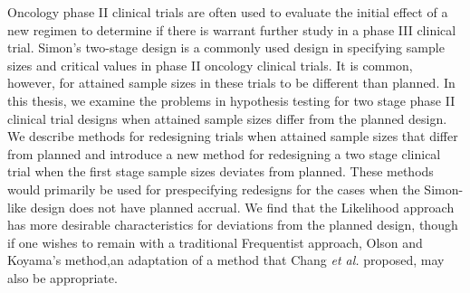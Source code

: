 \documentclass[12pt]{report}\usepackage[]{graphicx}\usepackage[]{color}
\newlength{\li}\setlength{\li}{14.48pt}
\newlength{\di}\setlength{\di}{-3.5mm}
\begin{document}
\vspace{7mm}
Oncology phase II clinical trials are often used to evaluate the initial effect of a new regimen to determine if there is warrant further study in a phase III clinical trial. Simon's two-stage design is a commonly used design in specifying sample sizes and critical values in phase II oncology clinical trials. It is common, however, for attained sample sizes in these trials to be different than planned. In this thesis, we examine the problems in hypothesis testing for two stage phase II clinical trial designs when attained sample sizes differ from the planned design. We describe methods for redesigning trials when attained sample sizes that differ from planned and introduce a new method for redesigning a two stage clinical trial when the first stage sample sizes deviates from planned. These methods would primarily be used for prespecifying redesigns for the cases when the Simon-like design does not have planned accrual. We find that the Likelihood approach has more desirable characteristics for deviations from the planned design, though if one wishes to remain with a traditional Frequentist approach, Olson and Koyama's method,an adaptation of a method that Chang \textit{et al.} proposed, may also be appropriate.  
\newpage

\normalsize
\doublespacing
{}
\setcounter{page}{1}


\end{document}
